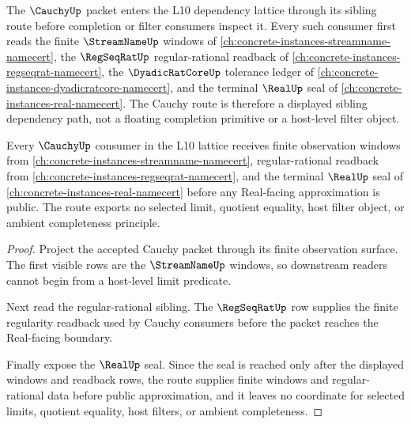 The $\CauchyUp$ packet enters the L10 dependency lattice through its sibling route before completion or filter consumers inspect it. Every such consumer first reads the finite $\StreamNameUp$ windows of \autoref{ch:concrete-instances-streamname-namecert}, the $\RegSeqRatUp$ regular-rational readback of \autoref{ch:concrete-instances-regseqrat-namecert}, the $\DyadicRatCoreUp$ tolerance ledger of \autoref{ch:concrete-instances-dyadicratcore-namecert}, and the terminal $\RealUp$ seal of \autoref{ch:concrete-instances-real-namecert}. The Cauchy route is therefore a displayed sibling dependency path, not a floating completion primitive or a host-level filter object.

\begin{theorem}
\label{thm:cauchy-l10-sibling-dependency-route}
Every $\CauchyUp$ consumer in the L10 lattice receives finite observation windows from \autoref{ch:concrete-instances-streamname-namecert}, regular-rational readback from \autoref{ch:concrete-instances-regseqrat-namecert}, and the terminal $\RealUp$ seal of \autoref{ch:concrete-instances-real-namecert} before any Real-facing approximation is public. The route exports no selected limit, quotient equality, host filter object, or ambient completeness principle.
\end{theorem}
\begin{proof}
Project the accepted Cauchy packet through its finite observation surface. The first visible rows are the $\StreamNameUp$ windows, so downstream readers cannot begin from a host-level limit predicate.

Next read the regular-rational sibling. The $\RegSeqRatUp$ row supplies the finite regularity readback used by Cauchy consumers before the packet reaches the Real-facing boundary.

Finally expose the $\RealUp$ seal. Since the seal is reached only after the displayed windows and readback rows, the route supplies finite windows and regular-rational data before public approximation, and it leaves no coordinate for selected limits, quotient equality, host filters, or ambient completeness.
\end{proof}

